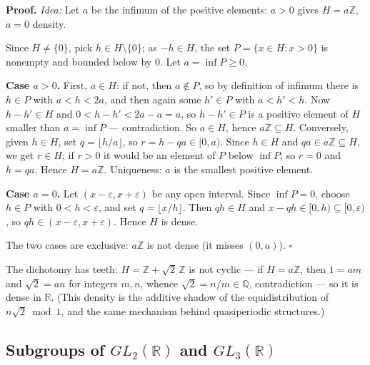 \documentclass[11pt]{report}
\renewenvironment{proof}[1][Proof]{\noindent\textbf{#1.} }{\hfill$\square$\par\vspace{5pt}}
\begin{document}
\begin{proof}
\textit{Idea:} Let $a$ be the infimum of the positive elements: $a > 0$ gives $H = a\mathbb{Z}$, $a = 0$ density.\par
Since $H \neq \{0\}$, pick $h \in H \setminus \{0\}$; as $-h \in H$, the set $P = \{x \in H : x > 0\}$ is nonempty and bounded below by $0$. Let $a = \inf P \geq 0$.

\textbf{Case $a > 0$.} First, $a \in H$: if not, then $a \notin P$, so by definition of infimum there is $h \in P$ with $a < h < 2a$, and then again some $h' \in P$ with $a < h' < h$. Now $h - h' \in H$ and $0 < h - h' < 2a - a = a$, so $h - h' \in P$ is a positive element of $H$ smaller than $a = \inf P$ --- contradiction. So $a \in H$, hence $a\mathbb{Z} \subseteq H$. Conversely, given $h \in H$, set $q = \lfloor h/a \rfloor$, so $r = h - qa \in [0, a)$. Since $h \in H$ and $qa \in a\mathbb{Z} \subseteq H$, we get $r \in H$; if $r > 0$ it would be an element of $P$ below $\inf P$, so $r = 0$ and $h = qa$. Hence $H = a\mathbb{Z}$. Uniqueness: $a$ is the smallest positive element.

\textbf{Case $a = 0$.} Let $(x - \varepsilon, x + \varepsilon)$ be any open interval. Since $\inf P = 0$, choose $h \in P$ with $0 < h < \varepsilon$, and set $q = \lfloor x/h \rfloor$. Then $qh \in H$ and $x - qh \in [0, h) \subseteq [0, \varepsilon)$, so $qh \in (x - \varepsilon, x + \varepsilon)$. Hence $H$ is dense.

The two cases are exclusive: $a\mathbb{Z}$ is not dense (it misses $(0, a)$).
\end{proof}

\begin{exbox}\label{ex:z-sqrt-2-z-dense}
The dichotomy has teeth: $H = \mathbb{Z} + \sqrt{2}\,\mathbb{Z}$ is not cyclic --- if $H = a\mathbb{Z}$, then $1 = am$ and $\sqrt{2} = an$ for integers $m, n$, whence $\sqrt{2} = n/m \in \mathbb{Q}$, contradiction --- so it is dense in $\mathbb{R}$. (This density is the additive shadow of the equidistribution of $n\sqrt{2} \bmod 1$, and the same mechanism behind quasiperiodic structures.)
\end{exbox}

\subsection{\texorpdfstring{Subgroups of $GL_2(\mathbb{R})$ and $GL_3(\mathbb{R})$}{Subgroups of GL₂(ℝ) and GL₃(ℝ)}}
\end{document}
